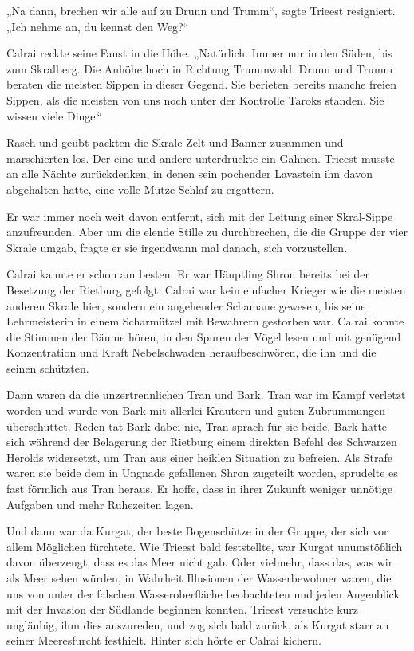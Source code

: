 „Na dann, brechen wir alle auf zu Drunn und Trumm“, sagte Trieest resigniert. „Ich nehme an, du kennst den Weg?“

Calrai reckte seine Faust in die Höhe. „Natürlich. Immer nur in den Süden, bis zum Skralberg. Die Anhöhe hoch in Richtung Trummwald. Drunn und Trumm beraten die meisten Sippen in dieser Gegend. Sie berieten bereits manche freien Sippen, als die meisten von uns noch unter der Kontrolle Taroks standen. Sie wissen viele Dinge.“

Rasch und geübt packten die Skrale Zelt und Banner zusammen und marschierten los. Der eine und andere unterdrückte ein Gähnen. Trieest musste an alle Nächte zurückdenken, in denen sein pochender Lavastein ihn davon abgehalten hatte, eine volle Mütze Schlaf zu ergattern.

Er war immer noch weit davon entfernt, sich mit der Leitung einer Skral-Sippe anzufreunden. Aber um die elende Stille zu durchbrechen, die die Gruppe der vier Skrale umgab, fragte er sie irgendwann mal danach, sich vorzustellen.

Calrai kannte er schon am besten. Er war Häuptling Shron bereits bei der Besetzung der Rietburg gefolgt. Calrai war kein einfacher Krieger wie die meisten anderen Skrale hier, sondern ein angehender Schamane gewesen, bis seine Lehrmeisterin in einem Scharmützel mit Bewahrern gestorben war. Calrai konnte die Stimmen der Bäume hören, in den Spuren der Vögel lesen und mit genügend Konzentration und Kraft Nebelschwaden heraufbeschwören, die ihn und die seinen schützten.

Dann waren da die unzertrennlichen Tran und Bark. Tran war im Kampf verletzt worden und wurde von Bark mit allerlei Kräutern und guten Zubrummungen überschüttet. Reden tat Bark dabei nie, Tran sprach für sie beide. Bark hätte sich während der Belagerung der Rietburg einem direkten Befehl des Schwarzen Herolds widersetzt, um Tran aus einer heiklen Situation zu befreien. Als Strafe waren sie beide dem in Ungnade gefallenen Shron zugeteilt worden, sprudelte es fast förmlich aus Tran heraus. Er hoffe, dass in ihrer Zukunft weniger unnötige Aufgaben und mehr Ruhezeiten lagen.

Und dann war da Kurgat, der beste Bogenschütze in der Gruppe, der sich vor allem Möglichen fürchtete. Wie Trieest bald feststellte, war Kurgat unumstößlich davon überzeugt, dass es das Meer nicht gab. Oder vielmehr, dass das, was wir als Meer sehen würden, in Wahrheit Illusionen der Wasserbewohner waren, die uns von unter der falschen Wasseroberfläche beobachteten und jeden Augenblick mit der Invasion der Südlande beginnen konnten. Trieest versuchte kurz ungläubig, ihm dies auszureden, und zog sich bald zurück, als Kurgat starr an seiner Meeresfurcht festhielt. Hinter sich hörte er Calrai kichern.

